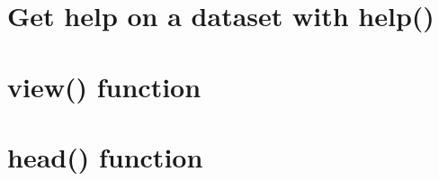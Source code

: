 \documentclass[
]{book}
\begin{document}
\hypertarget{get-help-on-a-dataset-with-help-1}{%
\section{Get help on a dataset with help()}\label{get-help-on-a-dataset-with-help-1}}

\hypertarget{view-function-1}{%
\section{view() function}\label{view-function-1}}

\hypertarget{head-function-1}{%
\section{head() function}\label{head-function-1}}

  
\end{document}
